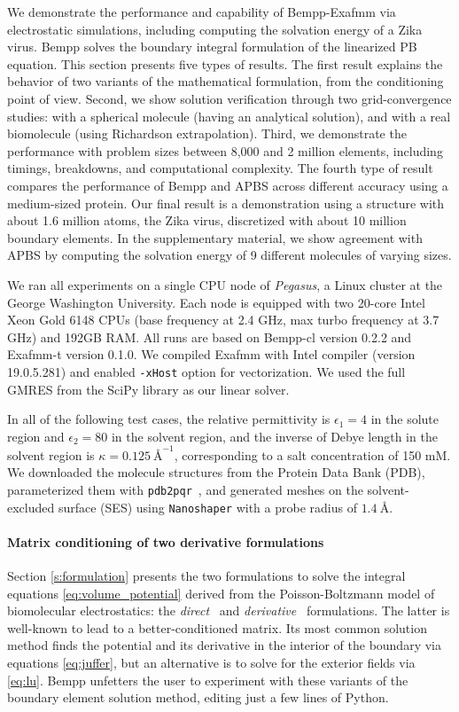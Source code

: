 We demonstrate the performance and capability of Bempp-Exafmm via electrostatic simulations, including computing the solvation energy of a Zika virus.
Bempp solves the boundary integral formulation of the linearized PB equation.
This section presents five types of results.
The first result explains the behavior of two variants of the mathematical formulation, from the conditioning point of view. 
Second, we show solution verification through two grid-convergence studies: with a spherical molecule (having an analytical solution), and with a real biomolecule (using Richardson extrapolation).
Third, we demonstrate the performance with problem sizes between 8,000 and 2 million elements, including timings, breakdowns, and computational complexity.
The fourth type of result compares the performance of Bempp and APBS across different accuracy using a medium-sized protein. 
Our final result is a demonstration using a structure with about 1.6 million atoms, the Zika virus, discretized with about 10 million boundary elements.
In the supplementary material, we show agreement with APBS by computing the solvation energy of 9 different molecules of varying sizes.

We ran all experiments on a single CPU node of \textit{Pegasus}, a Linux cluster at the George Washington University.
Each node is equipped with two 20-core Intel Xeon Gold 6148 CPUs (base frequency at 2.4 GHz, max turbo frequency at 3.7 GHz) and 192GB RAM.
All runs are based on Bempp-cl version 0.2.2 and Exafmm-t version 0.1.0.
We compiled Exafmm with Intel compiler (version 19.0.5.281) and enabled \texttt{-xHost} option for vectorization.
We used the full GMRES from the SciPy library as our linear solver.

In all of the following test cases, the relative permittivity is $\epsilon_1 = 4$ in the solute region and $\epsilon_2 = 80$ in the solvent region, and the inverse of Debye length in the solvent region is $\kappa = \qty{0.125}{\angstrom}^{-1}$, corresponding to a salt concentration of 150 mM.
We downloaded the molecule structures from the Protein Data Bank (PDB), parameterized them with \texttt{pdb2pqr}~\cite{DolinskyETal2004}, and generated meshes on the solvent-excluded surface (SES) using \texttt{Nanoshaper} with a probe radius of $\qty{1.4}{\angstrom}$.

\paragraph{Matrix conditioning of two derivative formulations} \label{result_conditioning}
Section \ref{s:formulation} presents the two formulations to solve the integral equations  \eqref{eq:volume_potential} derived from the Poisson-Boltzmann model of biomolecular electrostatics: 
the \emph{direct}~\cite{YoonLenhoff1990}  and \emph{derivative}~\cite{JufferETal1991} formulations.
The latter is well-known to lead to a better-conditioned matrix.
Its most common solution method finds the potential and its derivative in the interior of the boundary via equations \eqref{eq:juffer}, but an alternative is to solve for the exterior fields via \eqref{eq:lu}.
Bempp unfetters the user to experiment with these variants of the boundary element solution method, editing just a few lines of Python.

